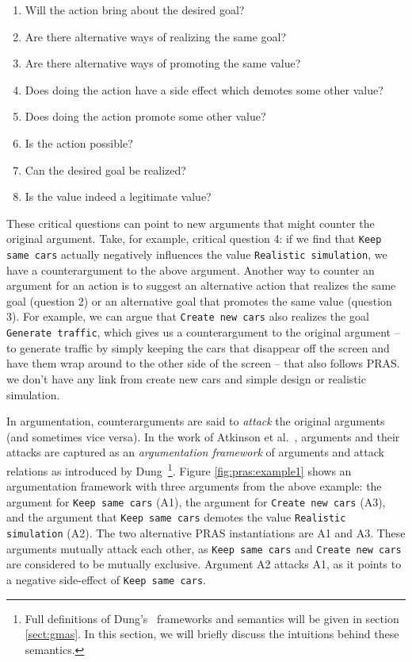 \begin{enumerate}
\item Will the action bring about the desired goal?
\item Are there alternative ways of realizing the same goal?
\item Are there alternative ways of promoting the same value?
\item Does doing the action have a side effect which demotes some other value?
\item Does doing the action promote some other value?
\item Is the action possible?
\item Can the desired goal be realized?
\item Is the value indeed a legitimate value?
\end{enumerate}

These critical questions can point to new arguments that might counter the original argument. Take, for example, critical question 4: if we find that  \texttt{Keep same cars} actually negatively influences the value  \texttt{Realistic simulation}, we have a counterargument to the above argument. Another way to counter an argument for an action is to suggest an alternative action that realizes the same goal (question 2) or an alternative goal that promotes the same value (question 3). For example, we can argue that  \texttt{Create new cars} also realizes the goal  \texttt{Generate traffic}, which gives us a counterargument to the original argument -- to generate traffic by simply keeping the cars that disappear off the screen and have them wrap around to the other side of the screen -- that also follows PRAS.  {we don't have any link from create new cars and simple design or realistic simulation.} 

In argumentation, counterarguments are said to \emph{attack} the original arguments (and sometimes vice versa). In the work of Atkinson et al.~\cite{atkinson2007}, arguments and their attacks are captured as an \emph{argumentation framework} of arguments and attack relations as introduced by Dung~\cite{Dung1995}\footnote{Full definitions of Dung's~\cite{Dung1995} frameworks and semantics will be given in section \ref{sect:gmas}. In this section, we will briefly discuss the intuitions behind these semantics.}. Figure \ref{fig:pras:example1} shows an argumentation framework with three arguments from the above example: the argument for  \texttt{Keep same cars} (A1), the argument for \texttt{Create new cars} (A3), and the argument that \texttt{Keep same cars} demotes the value  \texttt{Realistic simulation} (A2). The two alternative PRAS instantiations are A1 and A3. These arguments mutually attack each other, as \texttt{Keep same cars}  and \texttt{Create new cars} are considered to be mutually exclusive. Argument A2 attacks A1, as it points to a negative side-effect of \texttt{Keep same cars}. 

